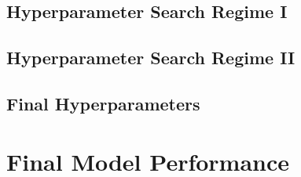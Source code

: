 \subsection{Hyperparameter Search Regime I}









\subsection{Hyperparameter Search Regime II}





\subsection{Final Hyperparameters}

\section{Final Model Performance}

